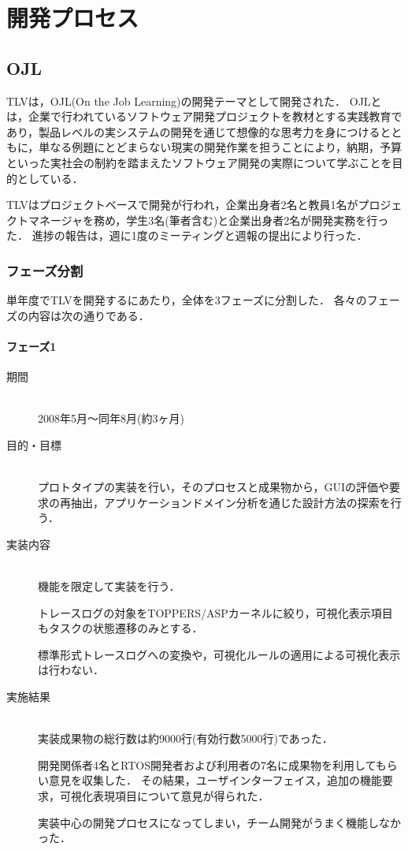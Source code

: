 \chapter{開発プロセス}

\section{OJL}

TLVは，OJL(On the Job Learning)の開発テーマとして開発された．
OJLとは，企業で行われているソフトウェア開発プロジェクトを教材とする実践教育であり，製品レベルの実システムの開発を通じて想像的な思考力を身につけるとともに，単なる例題にとどまらない現実の開発作業を担うことにより，納期，予算といった実社会の制約を踏まえたソフトウェア開発の実際について学ぶことを目的としている．

TLVはプロジェクトベースで開発が行われ，企業出身者2名と教員1名がプロジェクトマネージャを務め，学生3名(筆者含む)と企業出身者2名が開発実務を行った．
進捗の報告は，週に1度のミーティングと週報の提出により行った．

\subsection{フェーズ分割}

単年度でTLVを開発するにあたり，全体を3フェーズに分割した．
各々のフェーズの内容は次の通りである．

\subsubsection{フェーズ1}

\begin{description}
\item[期間] \mbox{} \\
2008年5月～同年8月(約3ヶ月)

\item[目的・目標] \mbox{} \\
プロトタイプの実装を行い，そのプロセスと成果物から，GUIの評価や要求の再抽出，アプリケーションドメイン分析を通じた設計方法の探索を行う．

\item[実装内容] \mbox{} \\
機能を限定して実装を行う．

トレースログの対象をTOPPERS/ASPカーネルに絞り，可視化表示項目もタスクの状態遷移のみとする．

標準形式トレースログへの変換や，可視化ルールの適用による可視化表示は行わない．

\item[実施結果] \mbox{} \\
実装成果物の総行数は約9000行(有効行数5000行)であった．

開発関係者4名とRTOS開発者および利用者の7名に成果物を利用してもらい意見を収集した．
その結果，ユーザインターフェイス，追加の機能要求，可視化表現項目について意見が得られた．

実装中心の開発プロセスになってしまい，チーム開発がうまく機能しなかった．

\end{description}

